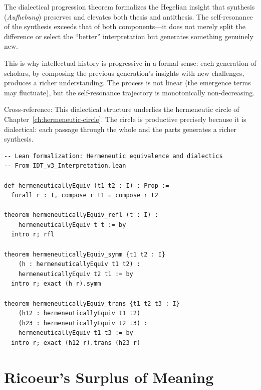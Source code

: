 \begin{interpretation}
\label{interp:hegel-dialectic}
The dialectical progression theorem formalizes the Hegelian insight that
synthesis (\textit{Aufhebung}) preserves and elevates both thesis and
antithesis.  The self-resonance of the synthesis exceeds that of both
components---it does not merely split the difference or select the ``better''
interpretation but generates something genuinely new.

This is why intellectual history is progressive in a formal sense: each
generation of scholars, by composing the previous generation's insights
with new challenges, produces a richer understanding.  The process is not
linear (the emergence terms may fluctuate), but the self-resonance
trajectory is monotonically non-decreasing.

Cross-reference: This dialectical structure underlies the hermeneutic
circle of Chapter~\ref{ch:hermeneutic-circle}.  The circle is productive
precisely because it is dialectical: each passage through the whole and
the parts generates a richer synthesis.
\end{interpretation}

\begin{lstlisting}
-- Lean formalization: Hermeneutic equivalence and dialectics
-- From IDT_v3_Interpretation.lean

def hermeneuticallyEquiv (t1 t2 : I) : Prop :=
  forall r : I, compose r t1 = compose r t2

theorem hermeneuticallyEquiv_refl (t : I) :
    hermeneuticallyEquiv t t := by
  intro r; rfl

theorem hermeneuticallyEquiv_symm {t1 t2 : I}
    (h : hermeneuticallyEquiv t1 t2) :
    hermeneuticallyEquiv t2 t1 := by
  intro r; exact (h r).symm

theorem hermeneuticallyEquiv_trans {t1 t2 t3 : I}
    (h12 : hermeneuticallyEquiv t1 t2)
    (h23 : hermeneuticallyEquiv t2 t3) :
    hermeneuticallyEquiv t1 t3 := by
  intro r; exact (h12 r).trans (h23 r)
\end{lstlisting}




\chapter{Ricoeur's Surplus of Meaning}
\label{ch:ricoeur-surplus}


